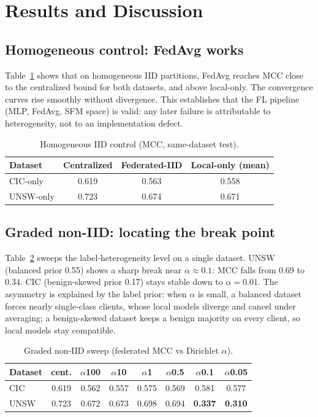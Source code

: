 \documentclass[11pt,a4paper]{article}
\begin{document}
\section{Results and Discussion}

\subsection{Homogeneous control: FedAvg works}
Table~\ref{tab:homo} shows that on homogeneous IID partitions, FedAvg reaches MCC
close to the centralized bound for both datasets, and above local-only. The
convergence curves rise smoothly without divergence. This establishes that the
FL pipeline (MLP, FedAvg, SFM space) is valid: any later failure is attributable
to heterogeneity, not to an implementation defect.

\begin{table}[h]
\centering\small
\caption{Homogeneous IID control (MCC, same-dataset test).}
\label{tab:homo}
\begin{tabular}{@{}lccc@{}}
\toprule
Dataset & Centralized & Federated-IID & Local-only (mean) \\
\midrule
CIC-only  & 0.619 & 0.563 & 0.558 \\
UNSW-only & 0.723 & 0.674 & 0.671 \\
\bottomrule
\end{tabular}
\end{table}

\subsection{Graded non-IID: locating the break point}
Table~\ref{tab:bridge} sweeps the label-heterogeneity level on a single dataset.
UNSW (balanced prior 0.55) shows a sharp break near \(\alpha\approx0.1\): MCC
falls from 0.69 to 0.34. CIC (benign-skewed prior 0.17) stays stable down to
\(\alpha=0.01\). The asymmetry is explained by the label prior: when
\(\alpha\) is small, a balanced dataset forces nearly single-class clients, whose
local models diverge and cancel under averaging; a benign-skewed dataset keeps a
benign majority on every client, so local models stay compatible.

\begin{table}[h]
\centering\small
\caption{Graded non-IID sweep (federated MCC vs Dirichlet $\alpha$).}
\label{tab:bridge}
\begin{tabular}{@{}lccccccc@{}}
\toprule
Dataset & cent. & $\alpha$100 & $\alpha$10 & $\alpha$1 & $\alpha$0.5 & $\alpha$0.1 & $\alpha$0.05 \\
\midrule
CIC  & 0.619 & 0.562 & 0.557 & 0.575 & 0.569 & 0.581 & 0.577 \\
UNSW & 0.723 & 0.672 & 0.673 & 0.698 & 0.694 & \textbf{0.337} & \textbf{0.310} \\
\bottomrule
\end{tabular}
\end{table}
\end{document}

